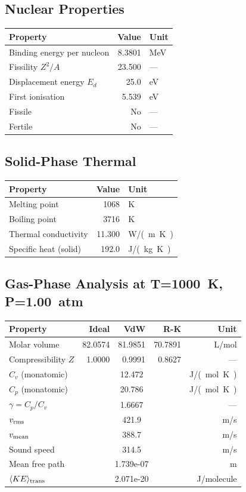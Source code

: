 \documentclass[11pt,a4paper]{article}
\begin{document}
\subsection{Nuclear Properties}
\begin{tabular}{lrl}
  \toprule
  Property & Value & Unit \\
  \midrule
  Binding energy per nucleon & 8.3801 & \si{MeV} \\
  Fissility $Z^2/A$ & 23.500 & --- \\
  Displacement energy $E_d$ & 25.0 & \si{eV} \\
  First ionisation & 5.539 & \si{eV} \\
  Fissile & No & --- \\
  Fertile & No & --- \\
  \bottomrule
\end{tabular}

\subsection{Solid-Phase Thermal}
\begin{tabular}{lrl}
  \toprule
  Property & Value & Unit \\
  \midrule
  Melting point & 1068 & \si{K} \\
  Boiling point & 3716 & \si{K} \\
  Thermal conductivity & 11.300 & \si{W/(m.K)} \\
  Specific heat (solid) & 192.0 & \si{J/(kg.K)} \\
  \bottomrule
\end{tabular}

\subsection{Gas-Phase Analysis at T=\SI{1000}{K}, P=\SI{1.00}{atm}}
\begin{tabular}{lrrrr}
  \toprule
  Property & Ideal & VdW & R-K & Unit \\
  \midrule
  Molar volume & 82.0574 & 81.9851 & 70.7891 & \si{L/mol} \\
  Compressibility $Z$ & 1.0000 & 0.9991 & 0.8627 & --- \\
  \midrule
  $C_v$ (monatomic) & \multicolumn{3}{c}{12.472} & \si{J/(mol.K)} \\
  $C_p$ (monatomic) & \multicolumn{3}{c}{20.786} & \si{J/(mol.K)} \\
  $\gamma = C_p/C_v$ & \multicolumn{3}{c}{1.6667} & --- \\
  $v_{\rm rms}$ & \multicolumn{3}{c}{421.9} & \si{m/s} \\
  $v_{\rm mean}$ & \multicolumn{3}{c}{388.7} & \si{m/s} \\
  Sound speed & \multicolumn{3}{c}{314.5} & \si{m/s} \\
  Mean free path & \multicolumn{3}{c}{1.739e-07} & \si{m} \\
  $\langle KE \rangle_{\rm trans}$ & \multicolumn{3}{c}{2.071e-20} & \si{J/molecule} \\
  \bottomrule
\end{tabular}
\end{document}
